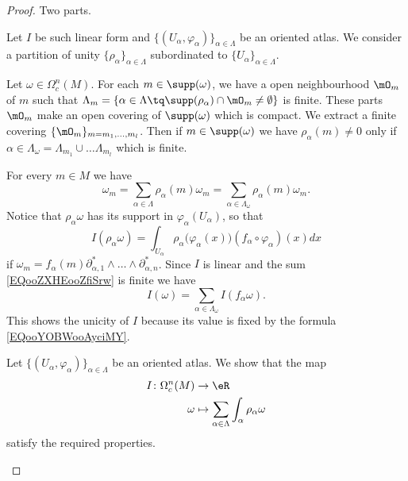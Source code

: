 \begin{proof}
	Two parts.
	\begin{subproof}
		\spitem[Unicity]
		Let \( I\) be such linear form and \( \{ (U_{\alpha}, \varphi_{\alpha}) \}_{\alpha\in\Lambda} \) be an oriented atlas. We consider a partition of unity \( \{ \rho_{\alpha} \}_{\alpha\in\Lambda}\) subordinated to \( \{ U_{\alpha} \}_{\alpha\in \Lambda}\).

		Let \( \omega\in\Omega_c^n(M)\). For each \( m\in\supp(\omega)\), we have a open neighbourhood \( \mO_m\) of \( m\) such that \( \Lambda_m=\{ \alpha\in\Lambda\tq \supp(\rho_{\alpha})\cap \mO_m\neq \emptyset \}\) is finite. These parts \( \mO_m\) make an open covering of \( \supp(\omega)\) which is compact. We extract a finite covering \( \{ \mO_m \}_{m=m_1,\ldots, m_l}\). Then if \( m\in \supp(\omega)\) we have \( \rho_{\alpha}(m)\neq 0\) only if \( \alpha\in \Lambda_{\omega}= \Lambda_{m_1}\cup\ldots \Lambda_{m_l}\) which is finite.

		For every \( m\in M\) we have
		\begin{equation}		\label{EQooZXHEooZfiSrw}
			\omega_m=\sum_{\alpha\in\Lambda}\rho_{\alpha}(m)\omega_m=\sum_{\alpha\in\Lambda_{\omega}}\rho_{\alpha}(m)\omega_m.
		\end{equation}
		Notice that \( \rho_{\alpha}\omega\) has its support in \( \varphi_{\alpha}(U_{\alpha})\), so that
		\begin{equation}
			I(\rho_{\alpha}\omega)=\int_{U_{\alpha}} \rho_{\alpha}\big( \varphi_{\alpha}(x) \big)(f_{\alpha}\circ\varphi_{\alpha})(x)dx
		\end{equation}
		if \( \omega_m=f_{\alpha}(m)\partial^*_{\alpha,1}\wedge\ldots\wedge\partial^*_{\alpha,n}\). Since \( I\) is linear and the sum \eqref{EQooZXHEooZfiSrw} is finite we have
		\begin{equation}		\label{EQooYOBWooAyciMY}
			I(\omega)=\sum_{\alpha\in\Lambda_{\omega}}I(f_{\alpha}\omega).
		\end{equation}
		This shows the unicity of \( I\) because its value is fixed by the formula \eqref{EQooYOBWooAyciMY}.

		\spitem[Existence]
		Let \( \{ (U_{\alpha}, \varphi_{\alpha}) \}_{\alpha\in\Lambda}\) be an oriented atlas. We show that the map
		\begin{equation}
			\begin{aligned}
				I\colon \Omega^n_c(M) & \to \eR                                                         \\
				\omega                & \mapsto \sum_{\alpha\in\Lambda}\int_{\alpha}\rho_{\alpha}\omega
			\end{aligned}
		\end{equation}
		satisfy the required properties.


\end{subproof}
\end{proof}

